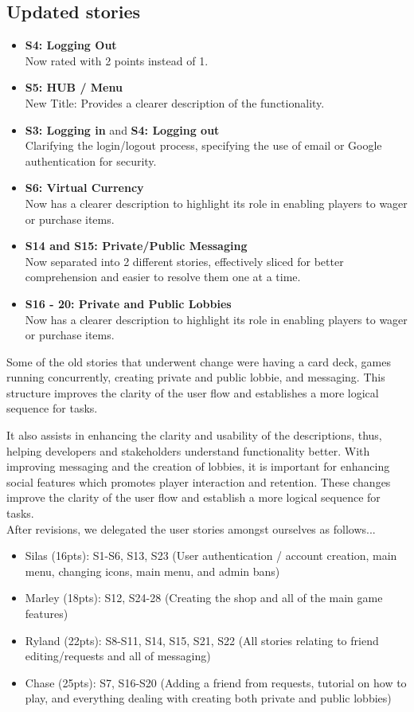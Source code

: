 \subsection{Updated stories}
\begin{itemize}
    \item \textbf{S4: Logging Out} \\
    Now rated with 2 points instead of 1.
    \item \textbf{S5: HUB / Menu} \\
    New Title: Provides a clearer description of the functionality.
    \item \textbf{S3: Logging in} and \textbf{S4: Logging out} \\
    Clarifying the login/logout process, specifying the use of email or Google authentication for security.
    \item \textbf{S6: Virtual Currency} \\
    Now has a clearer description to highlight its role in enabling players to wager or purchase items.
    \item \textbf{S14 and S15: Private/Public Messaging} \\
    Now separated into 2 different stories, effectively sliced for better comprehension and easier to resolve them one at a time.
    \item \textbf{S16 - 20: Private and Public Lobbies} \\
    Now has a clearer description to highlight its role in enabling players to wager or purchase items.
\end{itemize}
Some of the old stories that underwent change were having a card deck, games running concurrently, creating private and public lobbie, and messaging. This structure improves the clarity of the user flow and establishes a more logical sequence for tasks. 

It also assists in enhancing the clarity and usability of the descriptions, thus, helping developers and stakeholders understand functionality better. With improving messaging and the creation of lobbies, it is important for enhancing social features which promotes player interaction and retention. These changes improve the clarity of the user flow and establish a more logical sequence for tasks. \\

After revisions, we delegated the user stories amongst ourselves as follows...

\begin{itemize}
    \item Silas (16pts): S1-S6, S13, S23 (User authentication / account creation, main menu, changing icons, main menu, and admin bans)
    \item Marley (18pts): S12, S24-28 (Creating the shop and all of the main game features)
    \item Ryland (22pts): S8-S11, S14, S15, S21, S22 (All stories relating to friend editing/requests and all of messaging)
    \item Chase (25pts): S7, S16-S20 (Adding a friend from requests, tutorial on how to play, and everything dealing with creating both private and public lobbies)
\end{itemize}